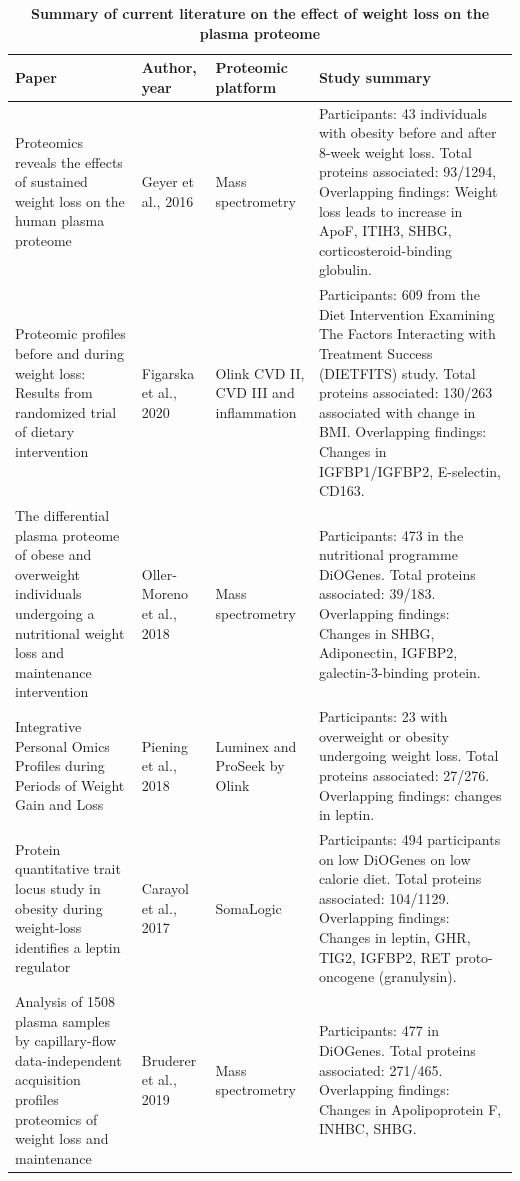 \documentclass[11pt,twoside]{bristolthesis}
\begin{document}
\begin{landscape}\begin{table}

\caption[Summary of current literature on the effect of weight loss on the plasma proteome]{\label{tab:weight-loss-protein}\textbf{Summary of current literature on the effect of weight loss on the plasma proteome}}
\centering
\begin{tabu} to 
\toprule
Paper & Author, year & Proteomic platform & Study summary\\
\midrule
Proteomics reveals the effects of sustained weight loss on the human plasma proteome & Geyer et al., 2016 & Mass spectrometry & Participants: 43 individuals with obesity before and after 8-week weight loss.
Total proteins associated: 93/1294,
Overlapping findings: Weight loss leads to increase in ApoF, ITIH3, SHBG, corticosteroid-binding globulin.\\
Proteomic profiles before and during weight loss: Results from randomized trial of dietary intervention & Figarska et al., 2020 & Olink CVD II, CVD III and inflammation & Participants: 609 from the Diet Intervention Examining The Factors Interacting with Treatment Success (DIETFITS) study.
Total proteins associated: 130/263 associated with change in BMI.
Overlapping findings: Changes in IGFBP1/IGFBP2, E-selectin, CD163.\\
The differential plasma proteome of obese and overweight individuals undergoing a nutritional weight loss and maintenance intervention & Oller-Moreno et al., 2018 & Mass spectrometry & Participants: 473 in the nutritional programme DiOGenes.
Total proteins associated: 39/183.
Overlapping findings: Changes in SHBG, Adiponectin, IGFBP2, galectin-3-binding protein.\\
Integrative Personal Omics Profiles during Periods of Weight Gain and Loss & Piening et al., 2018 & Luminex and ProSeek by Olink & Participants: 23 with overweight or obesity undergoing weight loss.
Total proteins associated: 27/276.
Overlapping findings: changes in leptin.\\
Protein quantitative trait locus study in obesity during weight-loss identifies a leptin regulator & Carayol et al., 2017 & SomaLogic & Participants: 494 participants on low DiOGenes on low calorie diet.
Total proteins associated: 104/1129.
Overlapping findings: Changes in leptin, GHR, TIG2, IGFBP2, RET proto-oncogene (granulysin).\\
\addlinespace
Analysis of 1508 plasma samples by capillary-flow data-independent acquisition profiles proteomics of weight loss and maintenance & Bruderer et al., 2019 & Mass spectrometry & Participants: 477 in DiOGenes.
Total proteins associated: 271/465.
Overlapping findings: Changes in Apolipoprotein F, INHBC, SHBG.\\
\bottomrule
\end{tabu}
\end{table}
\end{landscape}
\end{document}
